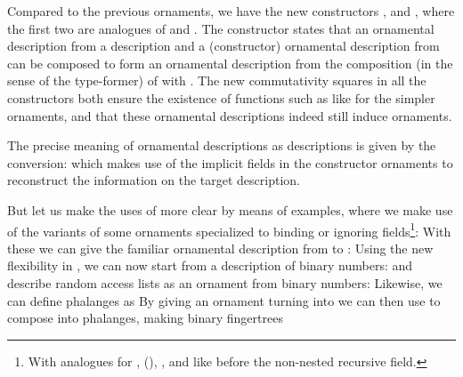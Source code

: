 Compared to the previous ornaments, we have the new constructors ,  and , where the first two are analogues of  and . The  constructor states that an ornamental description from a description  and a (constructor) ornamental description from  can be composed to form an ornamental description from the composition (in the sense of the  type-former) of  with . The new commutativity squares in all the constructors both ensure the existence of functions such as 
like for the simpler ornaments, and that these ornamental descriptions indeed still induce ornaments.

The precise meaning of ornamental descriptions as descriptions is given by the conversion:
which makes use of the implicit  fields in the constructor ornaments to reconstruct the information on the target description.

But let us make the uses of  more clear by means of examples, where we make use of the variants of some ornaments specialized to binding or ignoring fields\footnote{With analogues for , (), , and like before the non-nested recursive field.}:
With these we can give the familiar ornamental description from  to :
Using the new flexibility in , we can now start from a description of binary numbers:
and describe random access lists as an ornament from binary numbers:
Likewise, we can define phalanges as
By giving an ornament turning  into 
we can then use  to compose  into phalanges, making binary fingertrees
